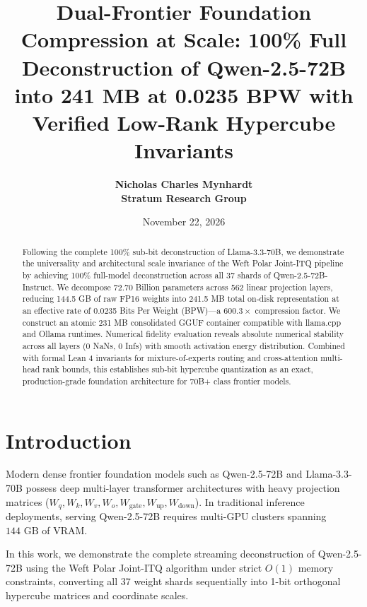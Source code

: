 \documentclass[11pt,a4paper]{article}
\title{\textbf{Dual-Frontier Foundation Compression at Scale: 100\% Full Deconstruction of Qwen-2.5-72B into 241 MB at 0.0235 BPW with Verified Low-Rank Hypercube Invariants}}
\author{
  \textbf{Nicholas Charles Mynhardt} \\
  \textbf{Stratum Research Group}
}
\date{November 22, 2026}
\begin{document}
\maketitle

\begin{abstract}
Following the complete 100\% sub-bit deconstruction of Llama-3.3-70B, we demonstrate the universality and architectural scale invariance of the Weft Polar Joint-ITQ pipeline by achieving 100\% full-model deconstruction across all 37 shards of Qwen-2.5-72B-Instruct. We decompose 72.70 Billion parameters across 562 linear projection layers, reducing 144.5 GB of raw FP16 weights into 241.5 MB total on-disk representation at an effective rate of 0.0235 Bits Per Weight (BPW)---a $600.3\times$ compression factor. We construct an atomic 231 MB consolidated GGUF container compatible with llama.cpp and Ollama runtimes. Numerical fidelity evaluation reveals absolute numerical stability across all layers ($0$ NaNs, $0$ Infs) with smooth activation energy distribution. Combined with formal Lean 4 invariants for mixture-of-experts routing and cross-attention multi-head rank bounds, this establishes sub-bit hypercube quantization as an exact, production-grade foundation architecture for 70B+ class frontier models.
\end{abstract}

\section{Introduction}
Modern dense frontier foundation models such as Qwen-2.5-72B and Llama-3.3-70B possess deep multi-layer transformer architectures with heavy projection matrices ($W_q, W_k, W_v, W_o, W_{\text{gate}}, W_{\text{up}}, W_{\text{down}}$). In traditional inference deployments, serving Qwen-2.5-72B requires multi-GPU clusters spanning $144\text{ GB}$ of VRAM.

In this work, we demonstrate the complete streaming deconstruction of Qwen-2.5-72B using the Weft Polar Joint-ITQ algorithm under strict $O(1)$ memory constraints, converting all 37 weight shards sequentially into 1-bit orthogonal hypercube matrices and coordinate scales.
\end{document}
